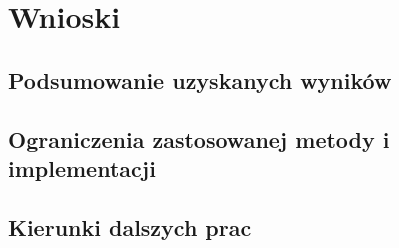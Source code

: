 \section{Wnioski}
\label{sec:conclusion}


\subsection{Podsumowanie uzyskanych wyników}
\label{subsec:conclusion_summary}

\subsection{Ograniczenia zastosowanej metody i implementacji}
\label{subsec:conclusion_limitations}

\subsection{Kierunki dalszych prac}
\label{subsec:conclusion_future_work}